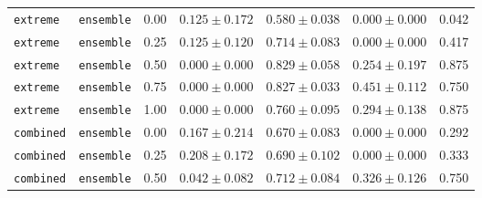 \documentclass{article}
\begin{document}
\begin{center}
\begin{tabular}{lllcccc}
\texttt{extreme} & \texttt{ensemble} & 0.00 & $0.125 \pm 0.172$ & $0.580 \pm 0.038$ & $0.000 \pm 0.000$ & 0.042 \\
\texttt{extreme} & \texttt{ensemble} & 0.25 & $0.125 \pm 0.120$ & $0.714 \pm 0.083$ & $0.000 \pm 0.000$ & 0.417 \\
\texttt{extreme} & \texttt{ensemble} & 0.50 & $0.000 \pm 0.000$ & $0.829 \pm 0.058$ & $0.254 \pm 0.197$ & 0.875 \\
\texttt{extreme} & \texttt{ensemble} & 0.75 & $0.000 \pm 0.000$ & $0.827 \pm 0.033$ & $0.451 \pm 0.112$ & 0.750 \\
\texttt{extreme} & \texttt{ensemble} & 1.00 & $0.000 \pm 0.000$ & $0.760 \pm 0.095$ & $0.294 \pm 0.138$ & 0.875 \\
\texttt{combined} & \texttt{ensemble} & 0.00 & $0.167 \pm 0.214$ & $0.670 \pm 0.083$ & $0.000 \pm 0.000$ & 0.292 \\
\texttt{combined} & \texttt{ensemble} & 0.25 & $0.208 \pm 0.172$ & $0.690 \pm 0.102$ & $0.000 \pm 0.000$ & 0.333 \\
\texttt{combined} & \texttt{ensemble} & 0.50 & $0.042 \pm 0.082$ & $0.712 \pm 0.084$ & $0.326 \pm 0.126$ & 0.750 \\
\bottomrule
\end{tabular}
\end{center}
\end{document}
